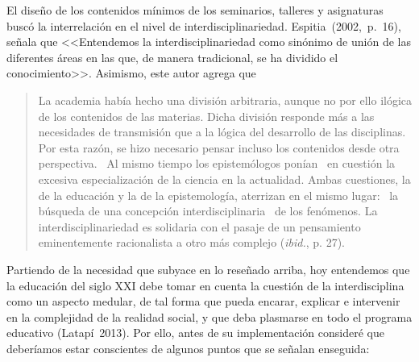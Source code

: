 \enlargethispage{1\baselineskip}
El diseño de los contenidos mínimos de los seminarios, talleres y 
asignaturas buscó la interrelación en el nivel de 
interdisciplinariedad. Espitia~(2002,~p.~16), señala que <<Entendemos la 
interdisciplinariedad como sinónimo de unión de las diferentes áreas en 
las que, de manera tradicional, se ha dividido el conocimiento>>.  
Asimismo, este autor agrega que
\begin{quotation}
La academia había hecho una división arbitraria, aunque no por ello 
ilógica de los contenidos de las materias. Dicha división responde más 
a las necesidades de transmisión que a la lógica del desarrollo de las 
disciplinas. Por esta razón, se hizo necesario pensar incluso los 
contenidos desde otra perspectiva. \ Al mismo tiempo los epistemólogos 
ponían \ en cuestión la excesiva especialización de la ciencia en la 
\mbox{actualidad}. Ambas cuestiones, la de la educación y la de la 
epistemología, aterrizan en el mismo lugar: \ la búsqueda de una 
concepción interdisciplinaria \ de los fenómenos. La 
interdisciplinariedad es solidaria con el pasaje de un pensamiento 
eminentemente racionalista a otro más complejo (\textit{ibid.}, p. 27).
\end{quotation}


Partiendo de la necesidad  que subyace en lo reseñado arriba, hoy entendemos 
que  la educación del siglo XXI debe tomar en cuenta
la cuestión de la interdisciplina como un aspecto medular, de tal forma que pueda encarar, explicar e intervenir en la complejidad de
la realidad social, y que deba plasmarse en todo el programa educativo (Latapí~2013). Por ello, antes de su implementación consideré que deberíamos estar conscientes de algunos puntos que se señalan enseguida: 

